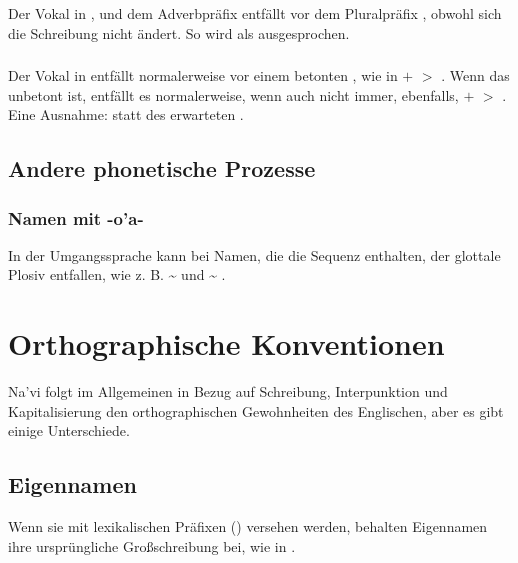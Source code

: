\subsubsection{} Der Vokal  in ,  und dem Adverbpräfix  entfällt vor dem Pluralpräfix , obwohl sich die Schreibung nicht ändert. So wird   als  ausgesprochen.\label{lands:elision-i}

\subsubsection{} Der Vokal in  entfällt normalerweise vor einem betonten , wie in  $+$  $>$ . Wenn das  unbetont ist, entfällt es normalerweise, wenn auch nicht immer, ebenfalls,  $+$  $>$ . Eine Ausnahme:  statt des erwarteten .

\subsection{Andere phonetische Prozesse}

\subsubsection{Namen mit -o'a-} \label{names-with-oa}
In der Umgangssprache kann bei Namen, die die Sequenz  enthalten, der glottale Plosiv entfallen, wie z. B.  \textasciitilde{}  und  \textasciitilde{} .

\section{Orthographische Konventionen}
\noindent Na'vi folgt im Allgemeinen in Bezug auf Schreibung, Interpunktion und Kapitalisierung den orthographischen Gewohnheiten des Englischen, aber es gibt einige Unterschiede.

\subsection{Eigennamen} Wenn sie mit lexikalischen Präfixen () versehen werden, behalten Eigennamen ihre ursprüngliche Großschreibung bei, wie in .

